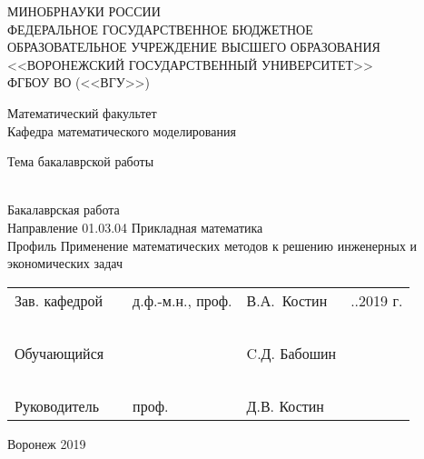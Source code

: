 \begin{titlepage}
    \begin{center}
        МИНОБРНАУКИ РОССИИ\\
        ФЕДЕРАЛЬНОЕ ГОСУДАРСТВЕННОЕ БЮДЖЕТНОЕ\\
        ОБРАЗОВАТЕЛЬНОЕ УЧРЕЖДЕНИЕ ВЫСШЕГО ОБРАЗОВАНИЯ\\
        <<ВОРОНЕЖСКИЙ ГОСУДАРСТВЕННЫЙ УНИВЕРСИТЕТ>>\\
        ФГБОУ ВО (<<ВГУ>>)
        \vskip 3cm

        Математический факультет\\
        Кафедра математического моделирования
        \vskip 3cm

        Тема бакалаврской работы\\
        ~\

        Бакалаврская работа\\
        Направление 01.03.04 Прикладная математика\\
        Профиль Применение математических методов к решению инженерных и экономических задач
        \vskip 3cm

        \begin{tabular}{l l l l l}
            Зав. кафедрой & \underline{\hspace{1.5cm}} & д.ф.-м.н., проф. & В.А. Костин &
            \underline{\hspace{0.5cm}}.\underline{\hspace{0.5cm}}.2019 г.\\
            ~\\
            Обучающийся & \underline{\hspace{1.5cm}} & & C.Д. Бабошин &\\
            ~\\
            Руководитель & \underline{\hspace{1.5cm}} & проф. & Д.В. Костин &
        \end{tabular}

        \vskip 5cm
        Воронеж 2019
    \end{center}
\end{titlepage}